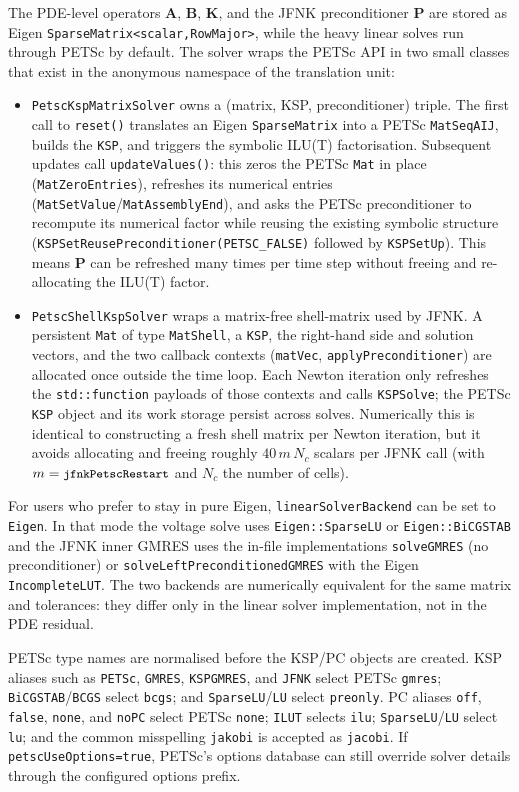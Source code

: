 \documentclass[11pt,a4paper]{article}
\newcommand{\code}[1]{\texttt{\small #1}}
\newcommand{\Kstif}{\mathbf{K}}
\newcommand{\Aimp}{\mathbf{A}}
\newcommand{\Bimp}{\mathbf{B}}
\begin{document}
The PDE-level operators $\Aimp$, $\Bimp$, $\Kstif$, and the JFNK preconditioner
$\mathbf{P}$ are stored as Eigen \code{SparseMatrix<scalar,RowMajor>}, while the
heavy linear solves run through PETSc by default. The solver wraps the PETSc
API in two small classes that exist in the anonymous namespace of the
translation unit:
\begin{itemize}
\item \code{PetscKspMatrixSolver} owns a (matrix, KSP, preconditioner)
triple. The first call to \code{reset()} translates an Eigen \code{SparseMatrix}
into a PETSc \code{MatSeqAIJ}, builds the \code{KSP}, and triggers the symbolic
ILU(T) factorisation. Subsequent updates call
\code{updateValues()}: this zeros the PETSc \code{Mat} in place
(\code{MatZeroEntries}), refreshes its numerical entries
(\code{MatSetValue}/\code{MatAssemblyEnd}), and asks the PETSc preconditioner to
recompute its numerical factor while reusing the existing symbolic structure
(\code{KSPSetReusePreconditioner(PETSC\_FALSE)} followed by
\code{KSPSetUp}). This means $\mathbf{P}$ can be refreshed many times per
time step without freeing and re-allocating the ILU(T) factor.
\item \code{PetscShellKspSolver} wraps a matrix-free shell-matrix used by
JFNK. A persistent \code{Mat} of type \code{MatShell}, a \code{KSP}, the
right-hand side and solution vectors, and the two callback contexts
(\code{matVec}, \code{applyPreconditioner}) are allocated once outside the time
loop. Each Newton iteration only refreshes the
\code{std::function} payloads of those contexts and calls \code{KSPSolve}; the
PETSc \code{KSP} object and its work storage persist across solves.
Numerically this is identical to
constructing a fresh shell matrix per Newton iteration, but it avoids
allocating and freeing roughly $40\,m\,N_c$ scalars per JFNK call (with
$m=\code{jfnkPetscRestart}$ and $N_c$ the number of cells).
\end{itemize}
For users who prefer to stay in pure Eigen, \code{linearSolverBackend} can be
set to \code{Eigen}. In that mode the voltage solve uses
\code{Eigen::SparseLU} or \code{Eigen::BiCGSTAB} and the JFNK inner GMRES uses
the in-file implementations \code{solveGMRES} (no preconditioner) or
\code{solveLeftPreconditionedGMRES} with the Eigen \code{IncompleteLUT}.
The two backends are numerically equivalent for the same matrix and tolerances:
they differ only in the linear solver implementation, not in the PDE residual.

PETSc type names are normalised before the KSP/PC objects are created. KSP
aliases such as \code{PETSc}, \code{GMRES}, \code{KSPGMRES}, and \code{JFNK}
select PETSc \code{gmres}; \code{BiCGSTAB}/\code{BCGS} select \code{bcgs}; and
\code{SparseLU}/\code{LU} select \code{preonly}. PC aliases
\code{off}, \code{false}, \code{none}, and \code{noPC} select PETSc
\code{none}; \code{ILUT} selects \code{ilu}; \code{SparseLU}/\code{LU} select
\code{lu}; and the common misspelling \code{jakobi} is accepted as
\code{jacobi}. If \code{petscUseOptions=true}, PETSc's options database can
still override solver details through the configured options prefix.
\end{document}
